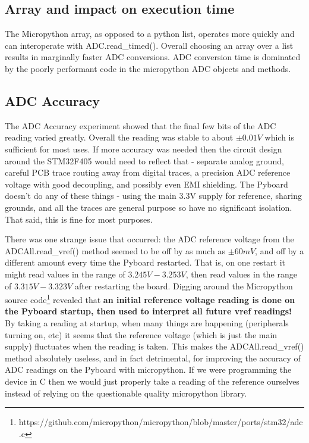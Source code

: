 \documentclass[11pt]{article}
\begin{document}
{	\subsection{Array and impact on execution time}
	The Micropython array, as opposed to a python list, operates more quickly and can interoperate with ADC.read\_timed(). Overall choosing an array over a list results in marginally faster ADC conversions. ADC conversion time is dominated by the poorly performant code in the micropython ADC objects and methods.
	
	\subsection{ADC Accuracy}
	The ADC Accuracy experiment showed that the final few bits of the ADC reading varied greatly. Overall the reading was stable to about $\pm0.01V$ which is sufficient for most uses. If more accuracy was needed then the circuit design around the STM32F405 would need to reflect that - separate analog ground, careful PCB trace routing away from digital traces, a precision ADC reference voltage with good decoupling, and possibly even EMI shielding. The Pyboard doesn't do any of these things - using the main 3.3V supply for reference, sharing grounds, and all the traces are general purpose so have no significant isolation. That said, this is fine for most purposes. 
	
	There was one strange issue that occurred: the ADC reference voltage from the ADCAll.read\_vref() method seemed to be off by as much as $\pm60mV$, and off by a different amount every time the Pyboard restarted. That is, on one restart it might read values in the range of $3.245V - 3.253V$, then read values in the range of $3.315V - 3.323V$ after restarting the board. Digging around the Micropython source code\footnote{https://github.com/micropython/micropython/blob/master/ports/stm32/adc.c} revealed that \textbf{an initial reference voltage reading is done on the Pyboard startup, then used to interpret all future vref readings!} By taking a reading at startup, when many things are happening (peripherals turning on, etc) it seems that the reference voltage (which is just the main supply) fluctuates when the reading is taken. This makes the ADCAll.read\_vref() method absolutely useless, and in fact detrimental, for improving the accuracy of ADC readings on the Pyboard with micropython. If we were programming the device in C then we would just properly take a reading of the reference ourselves instead of relying on the questionable quality micropython library.
	
}
\end{document}

